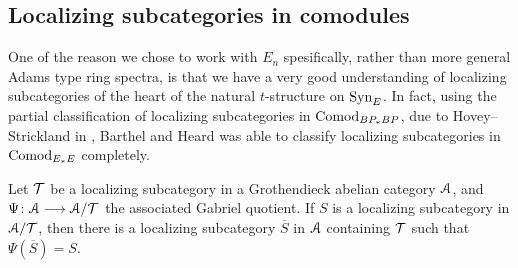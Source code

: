 








\subsection{Localizing subcategories in comodules}

One of the reason we chose to work with $E_n$ spesifically, rather than more general Adams type ring spectra, is that we have a very good understanding of localizing subcategories of the heart of the natural $t$-structure on $\mathrm{Syn}_{E}$. In fact, using the partial classification of localizing subcategories in $\mathrm{Comod}_{BP_*BP}$, due to Hovey--Strickland in \cite{hovey-strickland_2005a}, Barthel and Heard was able to classify localizing subcategories in $\mathrm{Comod}_{E_*E}$ completely. 

\begin{proposition}
    Let $\mathcal{T}$ be a localizing subcategory in a Grothendieck abelian category $\EuScript{A}$, and $\Psi\colon\EuScript{A}\longrightarrow \EuScript{A}/\mathcal{T}$ the associated Gabriel quotient. If $S$ is a localizing subcategory in $\EuScript{A}/\mathcal{T}$, then there is a localizing subcategory $\overline{S}$ in $\EuScript{A}$ containing $\mathcal{T}$ such that $\Psi(\overline{S})=S$. 
\end{proposition}


